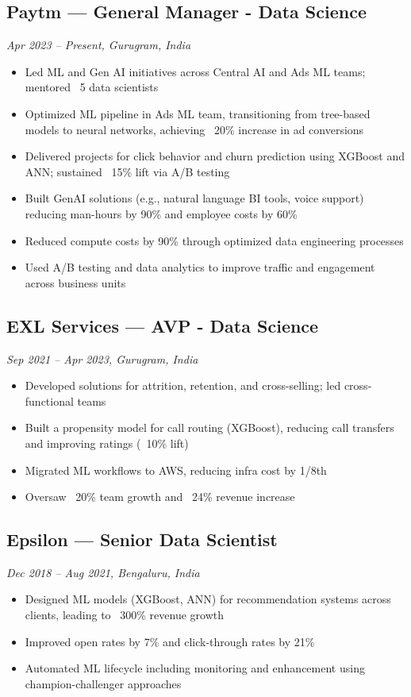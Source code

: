 \documentclass[a4paper,10pt]{article}
\begin{document}
\subsection*{Paytm — General Manager - Data Science}
\textit{Apr 2023 – Present, Gurugram, India}
\begin{itemize}[leftmargin=1em]
    \item Led ML and Gen AI initiatives across Central AI and Ads ML teams; mentored ~5 data scientists
    \item Optimized ML pipeline in Ads ML team, transitioning from tree-based models to neural networks, achieving ~20\% increase in ad conversions
    \item Delivered projects for click behavior and churn prediction using XGBoost and ANN; sustained ~15\% lift via A/B testing
    \item Built GenAI solutions (e.g., natural language BI tools, voice support) reducing man-hours by 90\% and employee costs by 60\%
    \item Reduced compute costs by 90\% through optimized data engineering processes
    \item Used A/B testing and data analytics to improve traffic and engagement across business units
\end{itemize}

\subsection*{EXL Services — AVP - Data Science}
\textit{Sep 2021 – Apr 2023, Gurugram, India}
\begin{itemize}[leftmargin=1em]
    \item Developed solutions for attrition, retention, and cross-selling; led cross-functional teams
    \item Built a propensity model for call routing (XGBoost), reducing call transfers and improving ratings (~10\% lift)
    \item Migrated ML workflows to AWS, reducing infra cost by 1/8th
    \item Oversaw ~20\% team growth and ~24\% revenue increase
\end{itemize}

\subsection*{Epsilon — Senior Data Scientist}
\textit{Dec 2018 – Aug 2021, Bengaluru, India}
\begin{itemize}[leftmargin=1em]
    \item Designed ML models (XGBoost, ANN) for recommendation systems across clients, leading to ~300\% revenue growth
    \item Improved open rates by 7\% and click-through rates by 21\%
    \item Automated ML lifecycle including monitoring and enhancement using champion-challenger approaches
\end{itemize}
\end{document}
